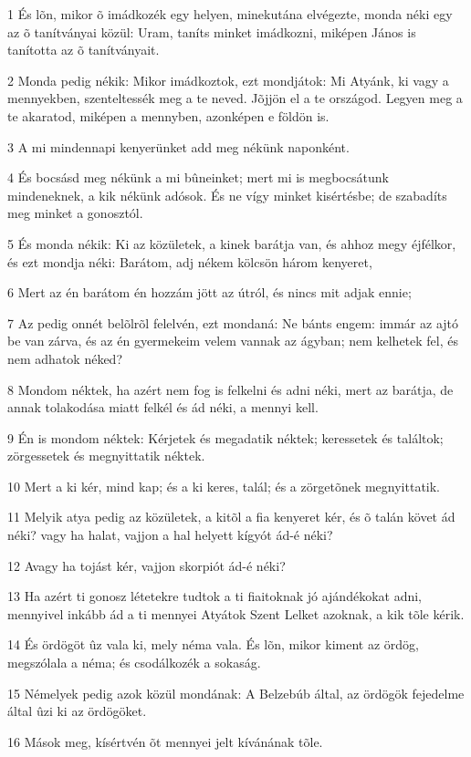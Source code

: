 \par 1 És lõn, mikor õ imádkozék egy helyen, minekutána elvégezte, monda néki egy az õ tanítványai közül: Uram, taníts minket imádkozni, miképen János is tanította az õ tanítványait.
\par 2 Monda pedig nékik: Mikor imádkoztok, ezt mondjátok: Mi Atyánk, ki vagy a mennyekben, szenteltessék meg a te neved. Jõjjön el a te országod. Legyen meg a te akaratod, miképen a mennyben, azonképen e földön is.
\par 3 A mi mindennapi kenyerünket add meg nékünk naponként.
\par 4 És bocsásd meg nékünk a mi bûneinket; mert mi is megbocsátunk mindeneknek, a kik nékünk adósok. És ne vígy minket kisértésbe; de szabadíts meg minket a gonosztól.
\par 5 És monda nékik: Ki az közületek, a kinek barátja van, és ahhoz megy éjfélkor, és ezt mondja néki: Barátom, adj nékem kölcsön három kenyeret,
\par 6 Mert az én barátom én hozzám jött az útról, és nincs mit adjak ennie;
\par 7 Az pedig onnét belõlrõl felelvén, ezt mondaná: Ne bánts engem: immár az ajtó be van zárva, és az én gyermekeim velem vannak az ágyban; nem kelhetek fel, és nem adhatok néked?
\par 8 Mondom néktek, ha azért nem fog is felkelni és adni néki, mert az barátja, de annak tolakodása miatt felkél és ád néki, a mennyi kell.
\par 9 Én is mondom néktek: Kérjetek és megadatik néktek; keressetek és találtok; zörgessetek és megnyittatik néktek.
\par 10 Mert a ki kér, mind kap; és a ki keres, talál; és a zörgetõnek megnyittatik.
\par 11 Melyik atya pedig az közületek, a kitõl a fia kenyeret kér, és õ talán követ ád néki? vagy ha halat, vajjon a hal helyett kígyót ád-é néki?
\par 12 Avagy ha tojást kér, vajjon skorpiót ád-é néki?
\par 13 Ha azért ti gonosz létetekre tudtok a ti fiaitoknak jó ajándékokat adni, mennyivel inkább ád a ti mennyei Atyátok Szent Lelket azoknak, a kik tõle kérik.
\par 14 És ördögöt ûz vala ki, mely néma vala. És lõn, mikor kiment az ördög, megszólala a néma; és csodálkozék a sokaság.
\par 15 Némelyek pedig azok közül mondának: A Belzebúb által, az ördögök fejedelme által ûzi ki az ördögöket.
\par 16 Mások meg, kísértvén õt mennyei jelt kívánának tõle.
